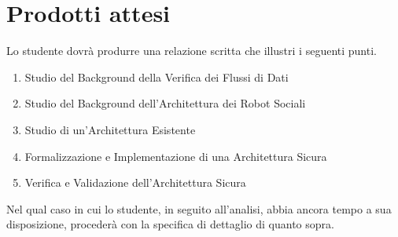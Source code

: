 \section*{Prodotti attesi}
Lo studente dovrà produrre una relazione scritta che illustri i seguenti punti.
\begin{enumerate}
    \item Studio del Background della Verifica dei Flussi di Dati
    \item Studio del Background dell'Architettura dei Robot Sociali
    \item Studio di un'Architettura Esistente
    \item Formalizzazione e Implementazione di una Architettura Sicura
    \item Verifica e Validazione dell'Architettura Sicura
\end{enumerate}

Nel qual caso in cui lo studente, in seguito all'analisi, abbia ancora tempo a sua disposizione, procederà con la specifica di dettaglio di quanto sopra.
